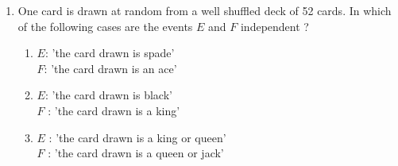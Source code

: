 \begin{enumerate}[label=\thesection.\arabic*,ref=\thesection.\theenumi]
\begin{enumerate}
\end{enumerate}
\solution

\item One card is drawn at random from a well shuffled deck of 52 cards. In which of the following cases are the events $E$ and $F$ independent ?
		\label{ncert/12/13/2/14}
\begin{enumerate}
\item $E$: 'the card drawn is spade'\\
$F$: 'the card drawn is an ace'
\item $E$: 'the card drawn is black’\\
$F$ : 'the card drawn is a king’
\item $E$ : 'the card drawn is a king or queen’\\
$F$ : 'the card drawn is a queen or jack’
\end{enumerate}
\solution

\end{enumerate}

